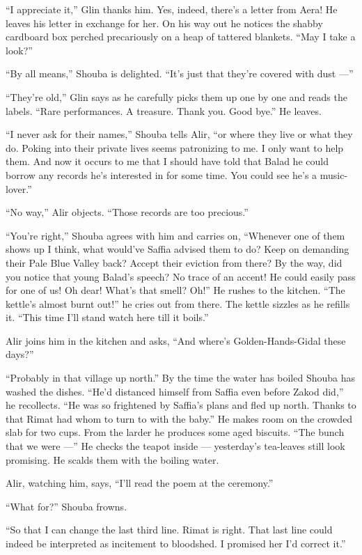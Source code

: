 \documentclass[twoside,11pt,openany]{book}
\begin{document}
``I appreciate it,'' Glin thanks him. Yes, indeed, there's a letter from Aera!
He leaves his letter in exchange for her.
On his way out he notices the shabby cardboard box perched precariously on a heap of
tattered blankets. ``May I take a look?''

``By all means,'' Shouba is delighted. ``It's just that they're covered with dust
---''

``They're old,'' Glin says as he carefully picks them up one by one and reads the labels.
``Rare performances. A treasure. Thank you. Good bye.'' He leaves.

``I never ask for their names,'' Shouba tells Alir, ``or where they live or what they do. Poking into their
private lives seems patronizing to me. I only want to help them.  And now it occurs to me that I should have told that
Balad he could borrow any records he's interested in for some time.  You could see he's a music-lover.''

``No way,'' Alir objects. ``Those records are too precious.''

``You're right,'' Shouba agrees with him and carries on, ``Whenever one of them
shows up I think, what would've Saffia advised them to do? Keep on demanding their Pale Blue Valley back? Accept
their eviction from there? By the way, did you notice that young Balad's speech? No trace of an accent! He could
easily pass for one of us! Oh dear! What's that smell? Oh!'' He rushes to the kitchen. ``The
kettle's almost burnt out!'' he cries out from there. The kettle sizzles as he refills it.
``This time I'll stand watch here till it boils.''

Alir joins him in the kitchen and asks, ``And where's Golden-Hands-Gidal these days?''

``Probably in that village up north.'' By the time the water has boiled Shouba has washed the
dishes. ``He'd distanced himself from Saffia even before Zakod did,'' he
recollects. ``He was so frightened by Saffia's plans and fled up north. Thanks to that Rimat had whom to
turn to with the baby.'' He makes room on the crowded slab for two cups. From the larder he produces some
aged biscuits. ``The bunch that we were ---'' He checks the teapot inside ---  yesterday's
tea-leaves still look promising.  He scalds them with the boiling water.

Alir, watching him, says, ``I'll read the poem at the ceremony.''

``What for?'' Shouba frowns.

``So that I can change the last third line. Rimat is right. That last line could indeed be interpreted as
incitement to bloodshed. I promised her I'd correct it.''
\end{document}
